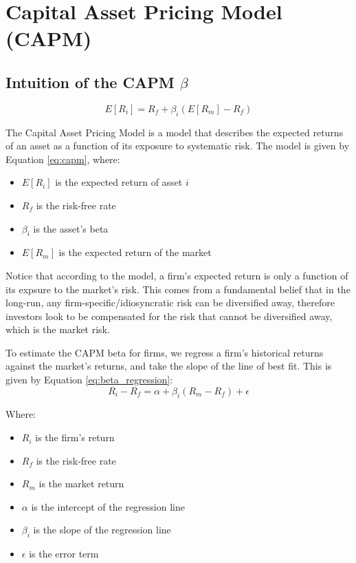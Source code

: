 \section{Capital Asset Pricing Model (CAPM)}
\label{sec:capital_asset_pricing_model}

\subsection{Intuition of the CAPM \texorpdfstring{$\beta$}{beta}}
\begin{equation}
    \label{eq:capm}
    E[R_i] = R_f + \beta_i (E[R_m] - R_f)
\end{equation}

The Capital Asset Pricing Model is a model that describes the expected returns of an asset as a function of its exposure to systematic risk.
The model is given by Equation \ref{eq:capm}, where:
\begin{itemize}
    \item $E[R_i]$ is the expected return of asset $i$
    \item $R_f$ is the risk-free rate
    \item $\beta_i$ is the asset's beta
    \item $E[R_m]$ is the expected return of the market
\end{itemize}

Notice that according to the model, a firm's expected return is only a function of its expsure to the market's risk.
This comes from a fundamental belief that in the long-run, any firm-specific/idiosyncratic risk can be diversified away, therefore
investors look to be compensated for the risk that cannot be diversified away, which is the market risk.

To estimate the CAPM beta for firms, we regress a firm's historical returns against the market's returns, and take the slope of the line of best fit.
This is given by Equation \ref{eq:beta_regression}:
\begin{equation}
    \label{eq:beta_regression}
    R_i - R_f = \alpha + \beta_i (R_m - R_f) + \epsilon
\end{equation}

Where:
\begin{itemize}
    \item $R_i$ is the firm's return
    \item $R_f$ is the risk-free rate
    \item $R_m$ is the market return
    \item $\alpha$ is the intercept of the regression line
    \item $\beta_i$ is the slope of the regression line
    \item $\epsilon$ is the error term
\end{itemize}


